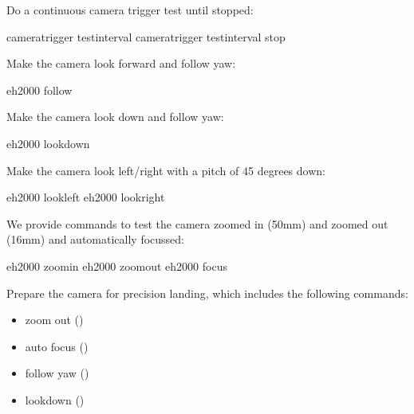 \documentclass[letterpaper,10pt,english]{sphinxmanual}
\begin{document}
Do a continuous camera trigger test until stopped:

\begin{sphinxVerbatim}[commandchars=\\\{\}]
camera\PYGZus{}trigger test\PYGZus{}interval
camera\PYGZus{}trigger test\PYGZus{}interval stop
\end{sphinxVerbatim}

Make the camera look forward and follow yaw:

\begin{sphinxVerbatim}[commandchars=\\\{\}]
eh2000  follow
\end{sphinxVerbatim}

Make the camera look down and follow yaw:

\begin{sphinxVerbatim}[commandchars=\\\{\}]
eh2000  lookdown
\end{sphinxVerbatim}

Make the camera look left/right with a pitch of 45 degrees down:

\begin{sphinxVerbatim}[commandchars=\\\{\}]
eh2000  lookleft
eh2000  lookright
\end{sphinxVerbatim}

We provide commands to test the camera zoomed in (50mm) and zoomed out (16mm) and automatically focussed:

\begin{sphinxVerbatim}[commandchars=\\\{\}]
eh2000  zoomin
eh2000  zoomout
eh2000  focus
\end{sphinxVerbatim}

Prepare the camera for precision landing, which includes the following commands:
\begin{itemize}
\item {} 
zoom out ()

\item {} 
auto focus ()

\item {} 
follow yaw ()

\item {} 
lookdown ()

\end{itemize}
\end{document}
